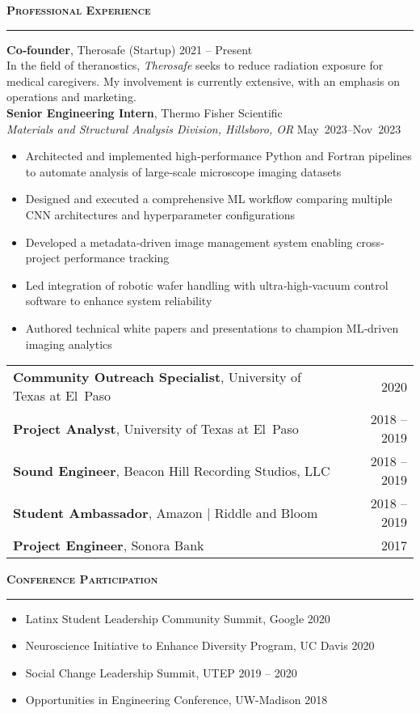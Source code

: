 \documentclass[11pt]{article}
\newcommand{\sectionheading}[1]{%
  \vspace{1.2ex}%
  {\large\bfseries\textsc{#1}}\par\vspace{0.4ex}%
  \color{gray}\rule{\linewidth}{0.5pt}\color{black}\vspace{0.6ex}%
}
\begin{document}
\sectionheading{Professional Experience}

\textbf{Co‐founder}, Therosafe (Startup) \hfill 2021 -- Present\\
In the field of theranostics, \textit{Therosafe} seeks to reduce radiation exposure for medical caregivers. My involvement is currently extensive, with an emphasis on operations and marketing.\\[0.8ex]

\textbf{Senior Engineering Intern}, Thermo Fisher Scientific\\
\textit{Materials and Structural Analysis Division, Hillsboro, OR} \hfill May~2023--Nov~2023
\begin{itemize}
  \item Architected and implemented high‐performance Python and Fortran pipelines to automate analysis of large‐scale microscope imaging datasets
  \item Designed and executed a comprehensive ML workflow comparing multiple CNN architectures and hyperparameter configurations
  \item Developed a metadata‐driven image management system enabling cross‐project performance tracking
  \item Led integration of robotic wafer handling with ultra‐high‐vacuum control software to enhance system reliability
  \item Authored technical white papers and presentations to champion ML‐driven imaging analytics
\end{itemize}

\begin{tabularx}{\textwidth}{@{}Y r@{}}
  \textbf{Community Outreach Specialist}, University of Texas at El Paso & 2020\\[0.4ex]
  \textbf{Project Analyst}, University of Texas at El Paso & 2018 -- 2019\\[0.4ex]
  \textbf{Sound Engineer}, Beacon Hill Recording Studios, LLC & 2018 -- 2019\\[0.4ex]
  \textbf{Student Ambassador}, Amazon | Riddle and Bloom & 2018 -- 2019\\[0.4ex]
  \textbf{Project Engineer}, Sonora Bank & 2017\\
\end{tabularx}

\sectionheading{Conference Participation}

\begin{itemize}
  \item Latinx Student Leadership Community Summit, Google \hfill 2020
  \item Neuroscience Initiative to Enhance Diversity Program, UC Davis \hfill 2020
  \item Social Change Leadership Summit, UTEP \hfill 2019 -- 2020
  \item Opportunities in Engineering Conference, UW-Madison \hfill 2018
\end{itemize}
\end{document}
